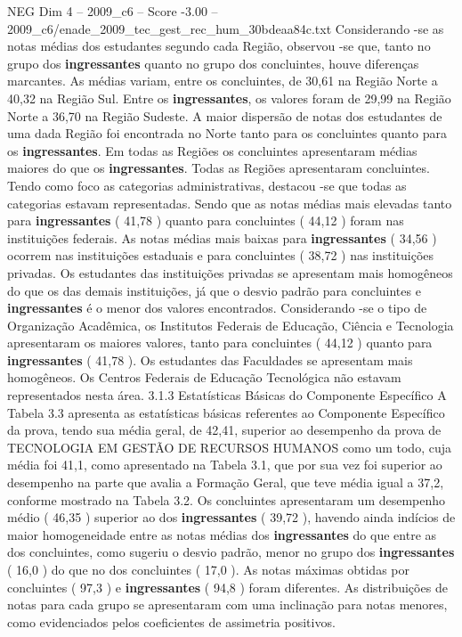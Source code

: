 \begin{textsample}{NEG Dim 4 – 2009\_c6 – Score -3.00 – 2009\_c6/enade\_2009\_tec\_gest\_rec\_hum\_30bdeaa84c.txt}
Considerando -se as notas médias dos estudantes segundo cada Região, observou -se que, tanto no grupo dos \textbf{ingressantes} quanto no grupo dos concluintes, houve diferenças marcantes.
As médias variam, entre os concluintes, de 30,61 na Região Norte a 40,32 na Região Sul.
Entre os \textbf{ingressantes}, os valores foram de 29,99 na Região Norte a 36,70 na Região Sudeste.
A maior dispersão de notas dos estudantes de uma dada Região foi encontrada no Norte tanto para os concluintes quanto para os \textbf{ingressantes}.
Em todas as Regiões os concluintes apresentaram médias maiores do que os \textbf{ingressantes}.
Todas as Regiões apresentaram concluintes.
Tendo como foco as categorias administrativas, destacou -se que todas as categorias estavam representadas.
Sendo que as notas médias mais elevadas tanto para \textbf{ingressantes} ( 41,78 ) quanto para concluintes ( 44,12 ) foram nas instituições federais.
As notas médias mais baixas para \textbf{ingressantes} ( 34,56 ) ocorrem nas instituições estaduais e para concluintes ( 38,72 ) nas instituições privadas.
Os estudantes das instituições privadas se apresentam mais homogêneos do que os das demais instituições, já que o desvio padrão para concluintes e \textbf{ingressantes} é o menor dos valores encontrados.
Considerando -se o tipo de Organização Acadêmica, os Institutos Federais de Educação, Ciência e Tecnologia apresentaram os maiores valores, tanto para concluintes ( 44,12 ) quanto para \textbf{ingressantes} ( 41,78 ).
Os estudantes das Faculdades se apresentam mais homogêneos.
Os Centros Federais de Educação Tecnológica não estavam representados nesta área. 3.1.3 Estatísticas Básicas do Componente Específico A Tabela 3.3 apresenta as estatísticas básicas referentes ao Componente Específico da prova, tendo sua média geral, de 42,41, superior ao desempenho da prova de TECNOLOGIA EM GESTÃO DE RECURSOS HUMANOS como um todo, cuja média foi 41,1, como apresentado na Tabela 3.1, que por sua vez foi superior ao desempenho na parte que avalia a Formação Geral, que teve média igual a 37,2, conforme mostrado na Tabela 3.2.
Os concluintes apresentaram um desempenho médio ( 46,35 ) superior ao dos \textbf{ingressantes} ( 39,72 ), havendo ainda indícios de maior homogeneidade entre as notas médias dos \textbf{ingressantes} do que entre as dos concluintes, como sugeriu o desvio padrão, menor no grupo dos \textbf{ingressantes} ( 16,0 ) do que no dos concluintes ( 17,0 ).
As notas máximas obtidas por concluintes ( 97,3 ) e \textbf{ingressantes} ( 94,8 ) foram diferentes.
As distribuições de notas para cada grupo se apresentaram com uma inclinação para notas menores, como evidenciados pelos coeficientes de assimetria positivos.

\end{textsample}
